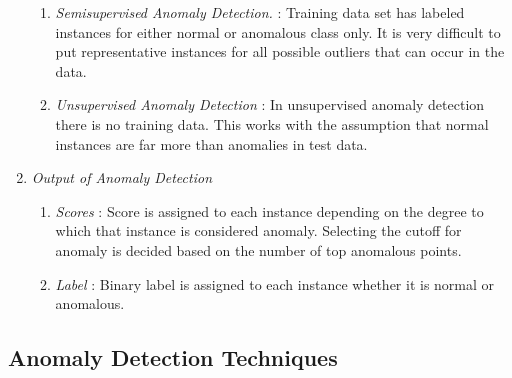 \begin{enumerate}
\begin{enumerate}
	\item \textit{Semisupervised Anomaly Detection.} : Training data set has labeled instances for either normal or anomalous class only. It is very difficult to put representative instances for all possible outliers that can occur in the data.
	
	\item \textit{Unsupervised Anomaly Detection} : In unsupervised anomaly detection there is no training data. This works with the assumption that normal instances are far more than anomalies in test data.   
\end{enumerate}


\item \textit{Output of Anomaly Detection}

\begin{enumerate}
	\item \textit{Scores} : Score is assigned to each instance depending on the degree to which that instance is considered anomaly. Selecting the cutoff for anomaly is decided based on the number of top anomalous points.
	
	\item \textit{Label} : Binary label is assigned to each instance whether it is normal or anomalous.
\end{enumerate} 
	
	
\end{enumerate}


		 

\subsection{Anomaly Detection Techniques} 


